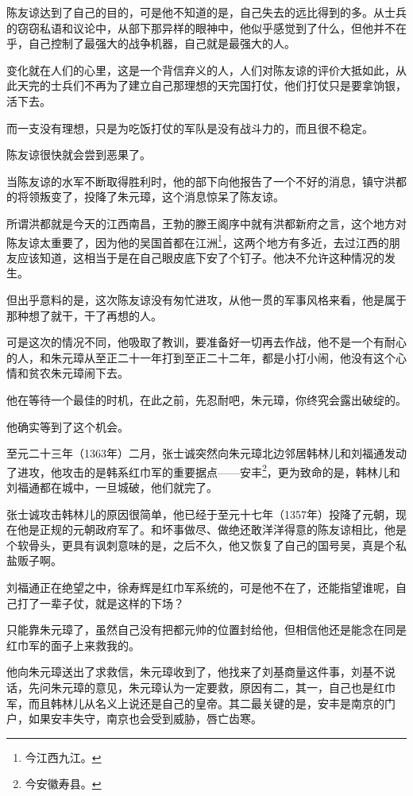 \begin{multicols}{\theparacolNo}
		陈友谅达到了自己的目的，可是他不知道的是，自己失去的远比得到的多。从士兵的窃窃私语和议论中，从部下那异样的眼神中，他似乎感觉到了什么，但他并不在乎，自己控制了最强大的战争机器，自己就是最强大的人。

		变化就在人们的心里，这是一个背信弃义的人，人们对陈友谅的评价大抵如此，从此天完的士兵们不再为了建立自己那理想的天完国打仗，他们打仗只是要拿饷银，活下去。

		而一支没有理想，只是为吃饭打仗的军队是没有战斗力的，而且很不稳定。

		陈友谅很快就会尝到恶果了。

		当陈友谅的水军不断取得胜利时，他的部下向他报告了一个不好的消息，镇守洪都的将领叛变了，投降了朱元璋，这个消息惊呆了陈友谅。

		所谓洪都就是今天的江西南昌，王勃的滕王阁序中就有洪都新府之言，这个地方对陈友谅太重要了，因为他的吴国首都在江洲\footnote{今江西九江。}，这两个地方有多近，去过江西的朋友应该知道，这相当于是在自己眼皮底下安了个钉子。他决不允许这种情况的发生。

		但出乎意料的是，这次陈友谅没有匆忙进攻，从他一贯的军事风格来看，他是属于那种想了就干，干了再想的人。

		可是这次的情况不同，他吸取了教训，要准备好一切再去作战，他不是一个有耐心的人，和朱元璋从至正二十一年打到至正二十二年，都是小打小闹，他没有这个心情和贫农朱元璋闹下去。

		他在等待一个最佳的时机，在此之前，先忍耐吧，朱元璋，你终究会露出破绽的。

		他确实等到了这个机会。

		至元二十三年（1363年）二月，张士诚突然向朱元璋北边邻居韩林儿和刘福通发动了进攻，他攻击的是韩系红巾军的重要据点——安丰\footnote{今安徽寿县。}，更为致命的是，韩林儿和刘福通都在城中，一旦城破，他们就完了。

		张士诚攻击韩林儿的原因很简单，他已经于至元十七年（1357年）投降了元朝，现在他是正规的元朝政府军了。和坏事做尽、做绝还敢洋洋得意的陈友谅相比，他是个软骨头，更具有讽刺意味的是，之后不久，他又恢复了自己的国号吴，真是个私盐贩子啊。

		刘福通正在绝望之中，徐寿辉是红巾军系统的，可是他不在了，还能指望谁呢，自己打了一辈子仗，就是这样的下场？

		只能靠朱元璋了，虽然自己没有把都元帅的位置封给他，但相信他还是能念在同是红巾军的面子上来救我的。

		他向朱元璋送出了求救信，朱元璋收到了，他找来了刘基商量这件事，刘基不说话，先问朱元璋的意见，朱元璋认为一定要救，原因有二，其一，自己也是红巾军，而且韩林儿从名义上说还是自己的皇帝。其二最关键的是，安丰是南京的门户，如果安丰失守，南京也会受到威胁，唇亡齿寒。


\end{multicols}
